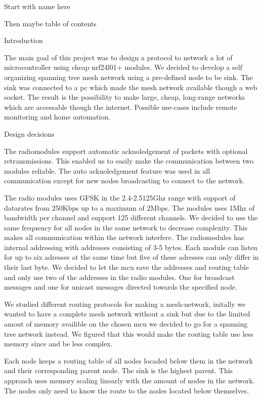 
Start with name here


Then maybe table of contents


Introduction

The main goal of this project was to design a protocol to
network a lot of microcontroller using cheap nrf24l01+ modules.  We
decided to develop a self organizing spanning tree mesh network using
a pre-defined node to be sink.  The sink was connected to a pc which
made the mesh network available though a web socket.  The result is
the possibility to make large, cheap, long-range networks which are
accessable though the internet.  Possible use-cases include remote
monitoring and home automation.

Design decisions

The radiomodules support automatic acknoledgement of packets with
optional retransmissions. This enabled us to easily make the
communication between two modules reliable. The auto acknoledgement
feature was used in all communication except for new nodes
broadcasting to connect to the network.

The radio modules uses GFSK in the 2.4-2.5125Ghz range with support of
datarates from 250Kbps up to a maximum of 2Mbps. The modules uses 1Mhz
of bandwidth per channel and support 125 different channels. We
decided to use the same frequency for all nodes in the same network to
decrease complexity. This makes all communication within the network
interfere. The radiomodules has internal addressing with addresses
consisting of 3-5 bytes. Each module can listen for up to six adresses
at the same time but five of these adresses can only differ in their
last byte. We decided to let the mcu save the addresses and routing
table and only use two of the addresses in the radio modules. One for
broadcast messages and one for unicast messages directed towards the
specified node.

We studied different routing protocols for making a mesh-network,
initally we wanted to have a complete mesh network without a sink but
due to the limited amout of memory availible on the chosen mcu we
decided to go for a spanning tree network instead. We figured that
this would make the routing table use less memory since and be less
complex. 

Each node keeps a routing table of all nodes locaded below them in the
network and their corresponding parent node. The sink is the highest
parent. This approach uses memory scaling linearly with the amount of
nodes in the network. The nodes only need to know the route to the
nodes located below themselves.

